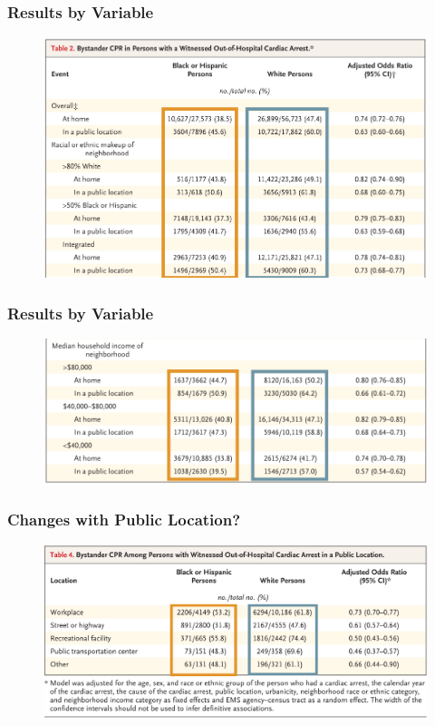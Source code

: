 \documentclass{beamer}
\begin{document}
		\begin{frame}
			\frametitle{Results by Variable}
			\begin{figure}
				\centering
				\includegraphics[width=1.0\linewidth]{img/table2-part1-boxed.png}
				\label{fig:tab2-part1-boxed}
			\end{figure}
		\end{frame}
		\begin{frame}
			\frametitle{Results by Variable}
			\begin{figure}
				\centering
				\includegraphics[width=1.0\linewidth]{img/table2-part2-boxed.png}
				\label{fig:tab2-part2-boxed}
			\end{figure}
		\end{frame}
		\begin{frame}
			\frametitle{Changes with Public Location?}
			\pause
			\begin{figure}
				\centering
				\includegraphics[width=1.0\linewidth]{img/table4-boxed}
				\label{fig:tab4-boxed}
			\end{figure}
		\end{frame}
\end{document}
